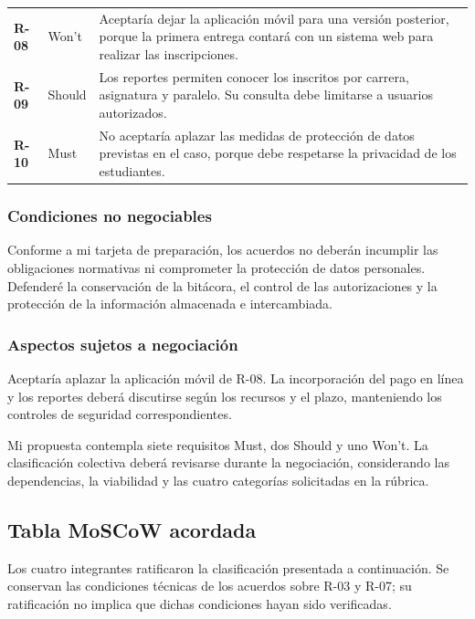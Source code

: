 \documentclass[12pt,a4paper]{article}
\begin{document}
\begin{longtable}{
    C{1.1cm}
    C{2cm}
    L{\dimexpr\textwidth-3.1cm-6\tabcolsep\relax}
}
\textbf{R-08} & Won't &
Aceptaría dejar la aplicación móvil para una versión
posterior, porque la primera entrega contará con
un sistema web para realizar las inscripciones. \\

\textbf{R-09} & Should &
Los reportes permiten conocer los inscritos por
carrera, asignatura y paralelo. Su consulta debe
limitarse a usuarios autorizados. \\

\textbf{R-10} & Must &
No aceptaría aplazar las medidas de protección
de datos previstas en el caso, porque debe
respetarse la privacidad de los estudiantes. \\

\end{longtable}
\endgroup

\subsubsection{Condiciones no negociables}

Conforme a mi tarjeta de preparación, los acuerdos
no deberán incumplir las obligaciones normativas
ni comprometer la protección de datos personales.
Defenderé la conservación de la bitácora, el control
de las autorizaciones y la protección de la información
almacenada e intercambiada.

\subsubsection{Aspectos sujetos a negociación}

Aceptaría aplazar la aplicación móvil de R-08.
La incorporación del pago en línea y los reportes
deberá discutirse según los recursos y el plazo,
manteniendo los controles de seguridad correspondientes.

Mi propuesta contempla siete requisitos Must, dos
Should y uno Won't. La clasificación colectiva
deberá revisarse durante la negociación, considerando
las dependencias, la viabilidad y las cuatro categorías
solicitadas en la rúbrica.

\subsection{Tabla MoSCoW acordada}

Los cuatro integrantes ratificaron la clasificación presentada a continuación. Se conservan las condiciones técnicas de los acuerdos sobre R-03 y R-07; su ratificación no implica que dichas condiciones hayan sido verificadas.
\end{document}
